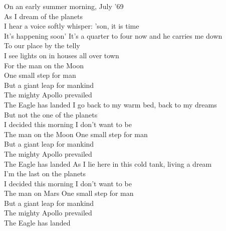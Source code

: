 On an early summer morning, July '69\tab{}\\
As I dream of the planets\tab{}\tab{}\\
I hear a voice softly whisper: 'son, it is time\tab{}\\
It's happening soon'\tab{}\tab{}
\hop
It's a quarter to four now and he carries me down\\
To our place by the telly\tab{}\tab{}\\
I see lights on in houses all over town\tab{}\\
For the man on the Moon\tab{}\tab{}
\hops
\tab{}\tab{}\\
 One small step for man\tab{}\\
 But a giant leap for mankind\\
 The mighty Apollo prevailed\\
 The Eagle has landed\tab{}
\hops
I go back to my warm bed, back to my dreams\\
But not the one of the planets\\
I decided this morning I don't want to be\\
The man on the Moon
\hops
{} One small step for man\\
 But a giant leap for mankind\\
 The mighty Apollo prevailed\\
 The Eagle has landed
\hops
As I lie here in this cold tank, living a dream\\
I'm the last on the planets\\
I decided this morning I don't want to be\\
The man on Mars
\hops
{} One small step for man\\
 But a giant leap for mankind\\
 The mighty Apollo prevailed\\
 The Eagle has landed

\clearpage
{}

